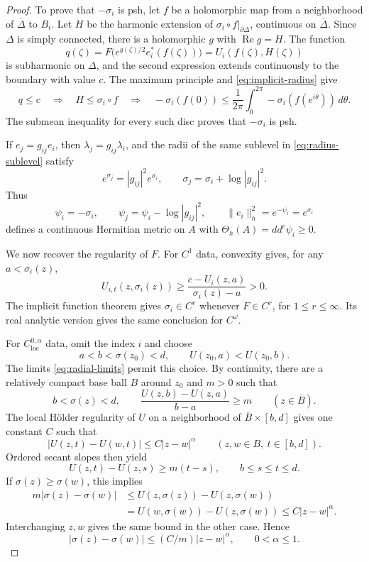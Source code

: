 \documentclass[11pt]{amsart}
\theoremstyle{definition}
\theoremstyle{remark}
\numberwithin{equation}{section}
\newcommand{\ddc}{dd^c}
\begin{document}
\begin{proof}
To prove that $-\sigma_i$ is psh, let $f$ be a holomorphic map from a
neighborhood of $\overline\Delta$ to $B_i$. Let $H$ be the harmonic
extension of $\sigma_i\circ f|_{\partial\Delta}$, continuous on
$\overline\Delta$. Since $\Delta$ is simply
connected, there is a holomorphic $g$ with $\operatorname{Re}g=H$.
The function
\[
 q(\zeta)=F\bigl(e^{g(\zeta)/2}e_i^*(f(\zeta))\bigr)
          =U_i(f(\zeta),H(\zeta))
\]
is subharmonic on $\Delta$, and the second expression extends
continuously to the boundary with value $c$. The maximum principle
and \eqref{eq:implicit-radius} give
\[
 q\le c\quad\Longrightarrow\quad
 H\le\sigma_i\circ f\quad\Longrightarrow\quad
 -\sigma_i(f(0))\le\frac1{2\pi}\int_0^{2\pi}
       -\sigma_i(f(e^{i\theta}))\,d\theta.
\]
The submean inequality for every such disc proves that $-\sigma_i$ is psh.

If $e_j=g_{ij}e_i$, then $\lambda_j=g_{ij}\lambda_i$, and the
radii of the same sublevel in \eqref{eq:radius-sublevel} satisfy
\[
 e^{\sigma_j}=|g_{ij}|^2e^{\sigma_i},\qquad
 \sigma_j=\sigma_i+\log|g_{ij}|^2.
\]
Thus
\begin{equation}\label{eq:radius-metric}
 \psi_i=-\sigma_i,\qquad
 \psi_j=\psi_i-\log|g_{ij}|^2,\qquad
 \|e_i\|_h^2=e^{-\psi_i}=e^{\sigma_i}
\end{equation}
defines a continuous Hermitian metric on $A$ with
$\Theta_h(A)=\ddc\psi_i\ge0$.

We now recover the regularity of $F$. For $C^1$ data,
convexity gives, for any $a<\sigma_i(z)$,
\begin{equation}\label{eq:radius-transversality}
 U_{i,t}(z,\sigma_i(z))
 \ge\frac{c-U_i(z,a)}{\sigma_i(z)-a}>0.
\end{equation}
The implicit function theorem gives $\sigma_i\in C^r$ whenever
$F\in C^r$, for $1\le r\le\infty$. Its real analytic version gives
the same conclusion for $C^\omega$.

For $C^{0,\alpha}_{\mathrm{loc}}$ data, omit the index $i$ and
choose
\[
 a<b<\sigma(z_0)<d,\qquad U(z_0,a)<U(z_0,b).
\]
The limits \eqref{eq:radial-limits} permit this choice.
By continuity, there are a relatively compact base ball $B$
around $z_0$ and $m>0$ such that
\[
 b<\sigma(z)<d,\qquad
 \frac{U(z,b)-U(z,a)}{b-a}\ge m
 \qquad(z\in\overline B).
\]
The local H\"older regularity of $U$ on a neighborhood of
$\overline B\times[b,d]$ gives one constant $C$ such that
\[
 |U(z,t)-U(w,t)|\le C|z-w|^\alpha
 \qquad(z,w\in B,\ t\in[b,d]).
\]
Ordered secant slopes then yield
\[
 U(z,t)-U(z,s)\ge m(t-s),\qquad b\le s\le t\le d.
\]
If $\sigma(z)\ge\sigma(w)$, this implies
\begin{align*}
 m|\sigma(z)-\sigma(w)|
 &\le U(z,\sigma(z))-U(z,\sigma(w))\\
 &=U(w,\sigma(w))-U(z,\sigma(w))
 \le C|z-w|^\alpha.
\end{align*}
Interchanging $z,w$ gives the same bound in the other case. Hence
\begin{equation}\label{eq:holder-radius}
 |\sigma(z)-\sigma(w)|\le(C/m)|z-w|^\alpha,
 \qquad 0<\alpha\le1.
\end{equation}


\end{proof}
\end{document}
